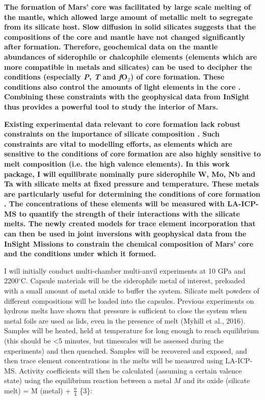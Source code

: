 \documentclass[11pt,twoside,a4paper]{article}
\begin{document}
\textbf{The formation of Mars' core was facilitated by large scale melting of the mantle, which allowed large amount of metallic melt to segregate from its silicate host. Slow diffusion in solid silicates suggests that the compositions of the core and mantle have not changed significantly after formation. Therefore, geochemical data on the mantle abundances of siderophile or chalcophile elements (elements which are more compatible in metals and silicates) can be used to decipher the conditions (especially \emph{P}, \emph{T} and \emph{f}O$_2$) of core formation. These conditions also control the amounts of light elements in the core \citep{Rubieetal2015}. Combining these constraints with the geophysical data from InSight thus provides a powerful tool to study the interior of Mars.}

\textbf{Existing experimental data relevant to core formation lack robust constraints on the importance of silicate composition \citep{Righter2016}. Such constraints are vital to modelling efforts, as elements which are sensitive to the conditions of core formation are also highly sensitive to melt composition (i.e. the high valence elements). In this work package, I will equilibrate nominally pure siderophile W, Mo, Nb and Ta with silicate melts at fixed pressure and temperature. These metals are particularly useful for determining the conditions of core formation \citep{OBE2008,CHBBD2014}. The concentrations of these elements will be measured with LA-ICP-MS to quantify the strength of their interactions with the silicate melts. The newly created models for trace element incorporation that can then be used in joint inversions with geophysical data from the InSight Missions \citep[see WP3;][]{BBPSR2015} to constrain the chemical composition of Mars' core and the conditions under which it formed.}

I will initially conduct multi-chamber multi-anvil experiments at 10 GPa and 2200$^{\circ}$C. Capsule materials will be the siderophile metal of interest, preloaded with a small amount of metal oxide to buffer the system. Silicate melt powders of different compositions will be loaded into the capsules. Previous experiments on hydrous melts have shown that pressure is sufficient to close the system when metal foils are used as lids, even in the presence of melt (Myhill et al., 2016). Samples will be heated, held at temperature for long enough to reach equilibrium (this should be <5 minutes, but timescales will be assessed during the experiments) and then quenched. Samples will be recovered and exposed, and then trace element concentrations in the melts will be measured using LA-ICP-MS. Activity coefficients will then be calculated (assuming a certain valence state) using the equilibrium reaction between a metal $M$ and its oxide  (silicate melt) = M (metal) + $\frac{n}{4}$ \{3\}:
\end{document}
